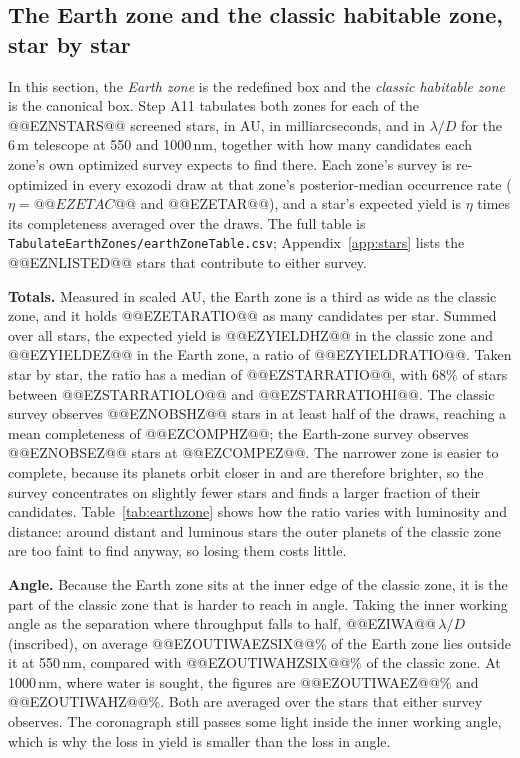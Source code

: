 \documentclass[11pt,a4paper]{article}
\begin{document}
\subsection{The Earth zone and the classic habitable zone, star by star}
\label{sec:earthzone}

In this section, the \emph{Earth zone} is the redefined box and the \emph{classic habitable zone}
is the canonical box. Step A11 tabulates both zones for each of the @@EZNSTARS@@ screened stars, in
AU, in milliarcseconds, and in $\lambda/D$ for the 6\,m telescope at 550 and 1000\,nm, together
with how many candidates each zone's own optimized survey expects to find there. Each zone's survey
is re-optimized in every exozodi draw at that zone's posterior-median occurrence rate
($\eta = @@EZETAC@@$ and @@EZETAR@@), and a star's expected yield is $\eta$ times its completeness
averaged over the draws. The full table is \texttt{TabulateEarthZones/earthZoneTable.csv};
Appendix~\ref{app:stars} lists the @@EZNLISTED@@ stars that contribute to either survey.

\textbf{Totals.} Measured in scaled AU, the Earth zone is a third as wide as the classic zone, and
it holds @@EZETARATIO@@ as many candidates per star. Summed over all stars, the expected yield is
@@EZYIELDHZ@@ in the classic zone and @@EZYIELDEZ@@ in the Earth zone, a ratio of
@@EZYIELDRATIO@@. Taken star by star, the ratio has a median of @@EZSTARRATIO@@, with 68\% of stars
between @@EZSTARRATIOLO@@ and @@EZSTARRATIOHI@@. The classic survey observes @@EZNOBSHZ@@ stars in
at least half of the draws, reaching a mean completeness of @@EZCOMPHZ@@; the Earth-zone survey
observes @@EZNOBSEZ@@ stars at @@EZCOMPEZ@@. The narrower zone is easier to complete, because its
planets orbit closer in and are therefore brighter, so the survey concentrates on slightly fewer
stars and finds a larger fraction of their candidates. Table~\ref{tab:earthzone} shows how the
ratio varies with luminosity and distance: around distant and luminous stars the outer planets of
the classic zone are too faint to find anyway, so losing them costs little.

\textbf{Angle.} Because the Earth zone sits at the inner edge of the classic zone, it is the part
of the classic zone that is harder to reach in angle. Taking the inner working angle as the
separation where throughput falls to half, @@EZIWA@@\,$\lambda/D$ (inscribed), on average
@@EZOUTIWAEZSIX@@\% of the Earth zone lies outside it at 550\,nm, compared with
@@EZOUTIWAHZSIX@@\% of the classic zone. At 1000\,nm, where water is sought, the figures are
@@EZOUTIWAEZ@@\% and @@EZOUTIWAHZ@@\%. Both are averaged over the stars that either survey
observes. The coronagraph still passes some light inside the inner working angle, which is why the
loss in yield is smaller than the loss in angle.
\end{document}
